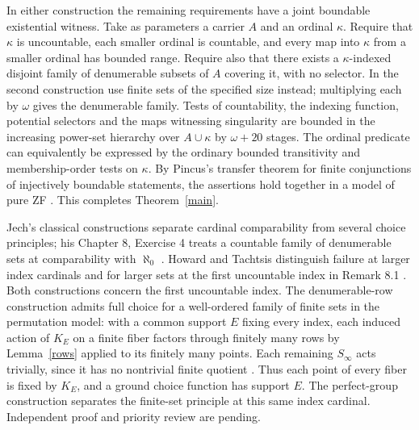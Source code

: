 \documentclass[11pt]{article}
\newcommand{\Sinf}{S_\infty}
\begin{document}
In either construction the remaining requirements have a joint boundable existential witness. Take as parameters a carrier $A$ and an ordinal $\kappa$. Require that $\kappa$ is uncountable, each smaller ordinal is countable, and every map into $\kappa$ from a smaller ordinal has bounded range. Require also that there exists a $\kappa$-indexed disjoint family of denumerable subsets of $A$ covering it, with no selector. In the second construction use finite sets of the specified size instead; multiplying each by $\omega$ gives the denumerable family. Tests of countability, the indexing function, potential selectors and the maps witnessing singularity are bounded in the increasing power-set hierarchy over $A\cup\kappa$ by $\omega+20$ stages. The ordinal predicate can equivalently be expressed by the ordinary bounded transitivity and membership-order tests on $\kappa$. By Pincus's transfer theorem for finite conjunctions of injectively boundable statements, the assertions hold together in a model of pure ZF \cite{pincus,mad}. This completes Theorem~\ref{main}.

Jech's classical constructions separate cardinal comparability from several choice principles; his Chapter 8, Exercise 4 treats a countable family of denumerable sets at comparability with $\aleph_0$ \cite{jech}. Howard and Tachtsis distinguish failure at larger index cardinals and for larger sets at the first uncountable index in Remark 8.1 \cite{ht}. Both constructions concern the first uncountable index. The denumerable-row construction admits full choice for a well-ordered family of finite sets in the permutation model: with a common support $E$ fixing every index, each induced action of $K_E$ on a finite fiber factors through finitely many rows by Lemma~\ref{rows} applied to its finitely many points. Each remaining $\Sinf$ acts trivially, since it has no nontrivial finite quotient \cite[Chapter 8, Exercise 4]{jech}. Thus each point of every fiber is fixed by $K_E$, and a ground choice function has support $E$. The perfect-group construction separates the finite-set principle at this same index cardinal. Independent proof and priority review are pending.
\end{document}

